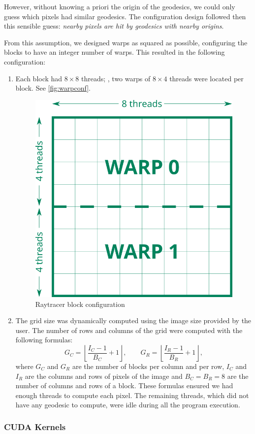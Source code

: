 However, without knowing a priori the origin of the geodesics, we could only guess which pixels had similar geodesics. The configuration design followed then this sensible guess: \emph{nearby pixels are hit by geodesics with nearby origins}.

From this assumption, we designed warps as squared as possible, configuring the blocks to have an integer number of warps. This resulted in the following configuration:
\begin{enumerate}
	\item Each block had $8\times8$ threads; \ie, two warps of $8\times4$ threads were located per block. See \autoref{fig:warpconf}.
	\begin{figure}[bth]
		\myfloatalign
		\includegraphics[width=.3\linewidth]{gfx/warpconf.png}
		\caption[Raytracer block configuration]{Raytracer block configuration}
		\label{fig:warpconf}
	\end{figure}
	\item The grid size was dynamically computed using the image size provided by the user. The number of rows and columns of the grid were computed with the following formulas:
	\begin{equation*}
	G_C = \left \lfloor{\frac{I_C - 1}{B_C} + 1}\right \rfloor, \qquad
	G_R = \left \lfloor{\frac{I_R - 1}{B_R} + 1}\right \rfloor,
	\end{equation*}
	where $G_C$ and $G_R$ are the number of blocks per column and per row, $I_C$ and $I_R$ are the columns and rows of pixels of the image and $B_C = B_R = 8$ are the number of columns and rows of a block. These formulas ensured we had enough threads to compute each pixel. The remaining threads, which did not have any geodesic to compute, were idle during all the program execution.
\end{enumerate}

\subsubsection*{CUDA Kernels}

